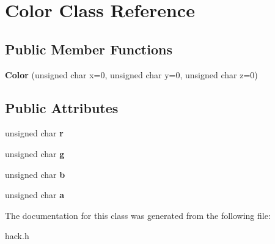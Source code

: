 \hypertarget{class_color}{\section{Color Class Reference}
\label{class_color}
}
\subsection*{Public Member Functions}
\begin{DoxyCompactItemize}
\item 
\hypertarget{class_color_a8e195b730ea2cd93d19012b9297ca368}{{\bfseries Color} (unsigned char x=0, unsigned char y=0, unsigned char z=0)}\label{class_color_a8e195b730ea2cd93d19012b9297ca368}

\end{DoxyCompactItemize}
\subsection*{Public Attributes}
\begin{DoxyCompactItemize}
\item 
\hypertarget{class_color_ab9a9c7134511f9b116a6fcc81a303ba6}{unsigned char {\bfseries r}}\label{class_color_ab9a9c7134511f9b116a6fcc81a303ba6}

\item 
\hypertarget{class_color_adc506c5063609cacdda2c007da3b7a5f}{unsigned char {\bfseries g}}\label{class_color_adc506c5063609cacdda2c007da3b7a5f}

\item 
\hypertarget{class_color_a9f00605f7024dcb79342e97fae52c1bd}{unsigned char {\bfseries b}}\label{class_color_a9f00605f7024dcb79342e97fae52c1bd}

\item 
\hypertarget{class_color_a39bb1f3f9a514ac1a581ca27fddebebc}{unsigned char {\bfseries a}}\label{class_color_a39bb1f3f9a514ac1a581ca27fddebebc}

\end{DoxyCompactItemize}


The documentation for this class was generated from the following file\-:\begin{DoxyCompactItemize}
\item 
hack.\-h\end{DoxyCompactItemize}
